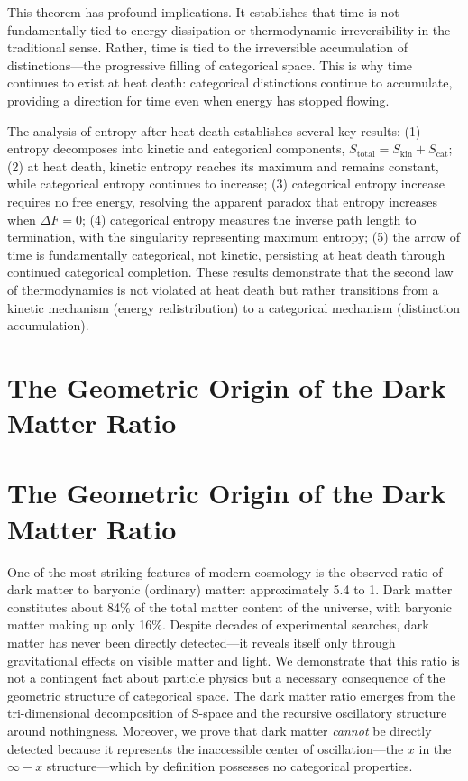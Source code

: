 \documentclass[12pt,a4paper]{article}
\theoremstyle{definition}
\theoremstyle{remark}
\begin{document}
This theorem has profound implications. It establishes that time is not fundamentally tied to energy dissipation or thermodynamic irreversibility in the traditional sense. Rather, time is tied to the irreversible accumulation of distinctions—the progressive filling of categorical space. This is why time continues to exist at heat death: categorical distinctions continue to accumulate, providing a direction for time even when energy has stopped flowing.


The analysis of entropy after heat death establishes several key results: (1) entropy decomposes into kinetic and categorical components, $S_{\text{total}} = S_{\text{kin}} + S_{\text{cat}}$; (2) at heat death, kinetic entropy reaches its maximum and remains constant, while categorical entropy continues to increase; (3) categorical entropy increase requires no free energy, resolving the apparent paradox that entropy increases when $\Delta F = 0$; (4) categorical entropy measures the inverse path length to termination, with the singularity representing maximum entropy; (5) the arrow of time is fundamentally categorical, not kinetic, persisting at heat death through continued categorical completion. These results demonstrate that the second law of thermodynamics is not violated at heat death but rather transitions from a kinetic mechanism (energy redistribution) to a categorical mechanism (distinction accumulation).



\section{The Geometric Origin of the Dark Matter Ratio}
\label{sec:ratio}
\section{The Geometric Origin of the Dark Matter Ratio}
\label{sec:dark_matter}

One of the most striking features of modern cosmology is the observed ratio of dark matter to baryonic (ordinary) matter: approximately 5.4 to 1. Dark matter constitutes about 84\% of the total matter content of the universe, with baryonic matter making up only 16\%. Despite decades of experimental searches, dark matter has never been directly detected—it reveals itself only through gravitational effects on visible matter and light. We demonstrate that this ratio is not a contingent fact about particle physics but a necessary consequence of the geometric structure of categorical space. The dark matter ratio emerges from the tri-dimensional decomposition of S-space and the recursive oscillatory structure around nothingness. Moreover, we prove that dark matter \emph{cannot} be directly detected because it represents the inaccessible center of oscillation—the $x$ in the $\infty - x$ structure—which by definition possesses no categorical properties.
\end{document}
